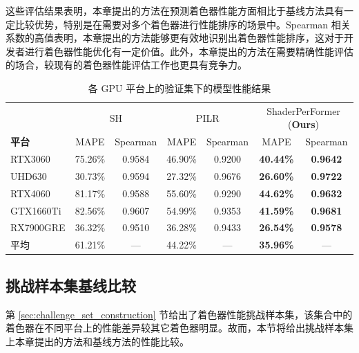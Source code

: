 这些评估结果表明，{\amend 本章提出的方法}在预测着色器性能方面相比于基线方法具有一定比较优势，特别是在需要对多个着色器进行性能排序的场景中。Spearman 相关系数的高值表明，{\amend 本章提出的方法}能够更有效地识别出着色器性能排序，这对于开发者进行着色器性能优化有一定价值。此外，{\amend 本章提出的方法}在需要精确性能评估的场合，较现有的着色器性能评估工作也更具有竞争力。

\begin{table}[h]
    \centering
    \caption{各 GPU 平台上的验证集下的模型性能结果}
    \label{table:mainResults}
    \begin{tabular}{l|cccccc}
    \toprule
        ~  & \multicolumn{2}{c}{SH} & \multicolumn{2}{c}{PILR} & \multicolumn{2}{c}{ShaderPerFormer (\textbf{Ours})} \\ 
        \textbf{平台}          & MAPE & Spearman & MAPE & Spearman & MAPE & Spearman \\
    \midrule
        RTX3060 &  75.26\% & 0.9584 &  46.90\% & 0.9200 & \textbf{40.44\%} & \textbf{0.9642} \\
        UHD630 &  30.73\% & 0.9594 &  27.32\% & 0.9676 & \textbf{26.60\%} & \textbf{0.9722} \\
        RTX4060 &  81.17\% & 0.9588 &  55.60\% & 0.9290 & \textbf{44.62\%} & \textbf{0.9632} \\
        GTX1660Ti &  82.56\% & 0.9607 &  54.99\% & 0.9353 & \textbf{41.59\%} & \textbf{0.9681} \\
        RX7900GRE &  36.32\% & 0.9510 &  36.28\% & 0.9433 & \textbf{26.54\%} & \textbf{0.9578} \\
    \midrule
        平均 & 61.21\% & --- & 44.22\% & --- & \textbf{35.96\%} & --- \\
    \bottomrule
    \end{tabular}
\end{table}

\subsection{{\added 挑战样本集基线比较}}

{\added 第 \ref{sec:challenge_set_construction} 节给出了着色器性能挑战样本集，该集合中的着色器在不同平台上的性能差异较其它着色器明显。故而，本节将给出挑战样本集上本章提出的方法和基线方法的性能比较。}

